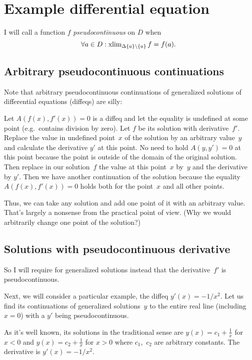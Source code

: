 \chapter{Example differential equation}

\begin{defn}
I will call a function $f$ \emph{pseudocontinuous} on $D$ when \[ \forall a \in D :
\operatorname{xlim}_{\Delta \{ a \} \setminus \{ a \}} f = f (a). \]
\end{defn}

\section{Arbitrary pseudocontinuous continuations}

Note that arbitrary pseudocontinuous continuations of generalized solutions of differential equations (diffeqs) are silly:

Let $A(f(x), f'(x))=0$ is a diffeq and let the equality is undefined at some point (e.g.\ contains division by zero). Let $f$ be its solution with derivative~$f'$.
Replace the value in undefined point~$x$ of the solution by an arbitrary value~$y$ and calculate the derivative $y'$ at this point. No need to hold $A(y,y')=0$ at this point because the point is outside of the domain of the original solution. Then replace in our solution~$f$ the value at this point~$x$ by~$y$ and the derivative by $y'$. Then we have another continuation of the solution because the equality $A(f(x), f'(x))=0$ holds both for the point~$x$ and all other points.

Thus, we can take any solution and add one point of it with an arbitrary value. That's largely a nonsense from the practical point of view. (Why we would arbitrarily change one point of the solution?)

\section{Solutions with pseudocontinuous derivative}

So I will require for generalized solutions instead that the derivative~$f'$ is pseudocontinuous.

Next, we will consider a particular example, the diffeq $y'(x)=-1/x^2$. Let us find its continuations of generalized solutions~$y$ to the entire real line (including $x=0$) with a $y'$ being pseudocontinuous.

As it's well known, its solutions in the traditional sense are
$y (x) = c_1 + \frac{1}{x}$ for $x < 0$ and $y (x) = c_2 + \frac{1}{x}$ for $x
> 0$ where $c_1$,~$c_2$ are arbitrary constants. The derivative is $y'(x)=-1/x^2$.

